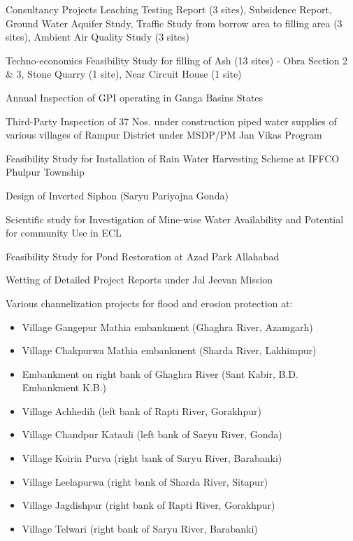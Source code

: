\begin{rubric}{Consultancy Projects}
\entry*{}
    Leaching Testing Report (3 sites), Subsidence Report, Ground Water Aquifer Study, Traffic Study from borrow area to filling area (3 sites), Ambient Air Quality Study (3 sites)
    
\entry*{}
    Techno-economics Feasibility Study for filling of Ash (13 sites) - Obra Section 2 \& 3, Stone Quarry (1 site), Near Circuit House (1 site)
    
\entry*{}
    Annual Inspection of GPI operating in Ganga Basins States
    
\entry*{}
    Third-Party Inspection of 37 Nos. under construction piped water supplies of various villages of Rampur District under MSDP/PM Jan Vikas Program
    
\entry*{}
    Feasibility Study for Installation of Rain Water Harvesting Scheme at IFFCO Phulpur Township 
    
\entry*{}
    Design of Inverted Siphon (Saryu Pariyojna Gonda) 

\entry*{}
    Scientific study for Investigation of Mine-wise Water Availability and Potential for community Use in ECL

    
\entry*{}
    Feasibility Study for Pond Restoration at Azad Park Allahabad
    
\entry*{}
    Wetting of Detailed Project Reports under Jal Jeevan Mission
    
\entry*{}
    Various channelization projects for flood and erosion protection at:
    \begin{itemize}
        \item Village Gangepur Mathia embankment (Ghaghra River, Azamgarh)
        \item Village Chakpurwa Mathia embankment (Sharda River, Lakhimpur)
        \item Embankment on right bank of Ghaghra River (Sant Kabir, B.D. Embankment K.B.)
        \item Village Achhedih (left bank of Rapti River, Gorakhpur)
        \item Village Chandpur Katauli (left bank of Saryu River, Gonda)
        \item Village Koirin Purva (right bank of Saryu River, Barabanki)
        \item Village Leelapurwa (right bank of Sharda River, Sitapur)
        \item Village Jagdishpur (right bank of Rapti River, Gorakhpur)
        \item Village Telwari (right bank of Saryu River, Barabanki)
    \end{itemize}
\end{rubric}